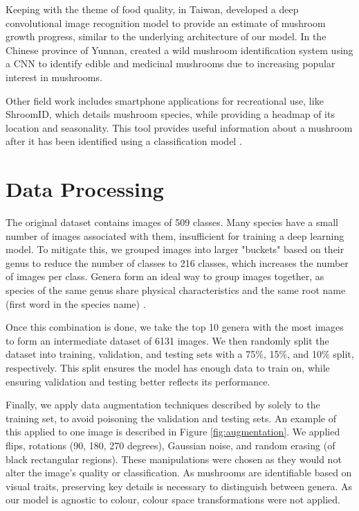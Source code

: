 \documentclass{article} %
\begin{document}
Keeping with the theme of food quality, in Taiwan, \cite{LuLiawEtAl.DevelopmentMushroomGrowth.2019} developed a deep convolutional image recognition model to provide an estimate of mushroom growth progress, similar to the underlying architecture of our model. In the Chinese province of Yunnan, \cite{H.ZhaoF.GeEtAl.IdentificationWildMushroom.2021} created a wild mushroom identification system using a CNN to identify edible and medicinal mushrooms due to increasing popular interest in mushrooms.

Other field work includes smartphone applications for recreational use, like ShroomID, which details mushroom species, while providing a headmap of its location and seasonality. This tool provides useful information about a mushroom after it has been identified using a classification model \citep{.ShroomID.2023}.

\section{Data Processing}
\label{sec:data_processing}
The original dataset contains images of 509 classes. Many species have a small number of images associated with them, insufficient for training a deep learning model. To mitigate this, we grouped images into larger "buckets" based on their genus to reduce the number of classes to 216 classes, which increases the number of images per class. Genera form an ideal way to group images together, as species of the same genus share physical characteristics and the same root name (first word in the species name) \citep{HollisterCaiEtAl.UsingComputerVision.2023}.

Once this combination is done, we take the top 10 genera with the most images to form an intermediate dataset of 6131 images. We then randomly split the dataset into training, validation, and testing sets with a 75\%, 15\%, and 10\% split, respectively. This split ensures the model has enough data to train on, while ensuring validation and testing better reflects its performance.

Finally, we apply data augmentation techniques described by \cite{ShortenKhoshgoftaar.SurveyImageData.2019} solely to the training set, to avoid poisoning the validation and testing sets. An example of this applied to one image is described in Figure \ref{fig:augmentation}. We applied flips, rotations (90, 180, 270 degrees), Gaussian noise, and random erasing (of black rectangular regions). These manipulations were chosen as they would not alter the image's quality or classification. As mushrooms are identifiable based on visual traits, preserving key details is necessary to distinguish between genera. As our model is agnostic to colour, colour space transformations were not applied.
\end{document}

